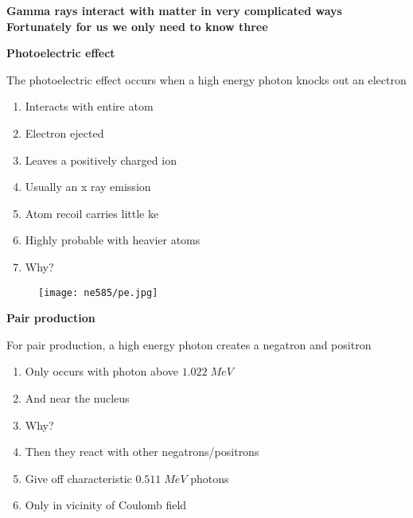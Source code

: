\documentclass[aspectratio=1610,pdftex,dvipsnames,compress,xcolor={dvipsnames}]{beamer}
\newcommand{\acf}{\acrfull} %
\begin{document}
\begin{frame}[plain]{}
    \centering\Large\textbf{Gamma rays interact with matter in very complicated ways}\\
    \centering\small\textbf{Fortunately for us we only need to know three}
\end{frame}


\begin{frame}[plain]{}
    \centering\LARGE\textbf{Photoelectric effect}
\end{frame}


\addtocounter{framenumber}{-2} 
\begin{frame}{The photoelectric effect occurs when a high energy photon knocks out an electron}
    \begin{enumerate}[series=outerlist,topsep=0pt,itemsep=21pt,leftmargin=*,label=(\arabic*)]
        \item[]Interacts with entire atom
        \item[]Electron ejected
        \item[]Leaves a positively charged ion
        \item[]Usually an x ray emission
        \item[]Atom recoil carries little \acf{ke}
        \item[]Highly probable with heavier atoms
        \item[]Why?
    \end{enumerate}
\end{frame}


\begin{frame}{}
    \begin{figure}
        \centering
        \texttt{[image: ne585/pe.jpg]}
    \end{figure}
\end{frame}


\begin{frame}[plain]{}
    \centering\LARGE\textbf{Pair production}
\end{frame}


\addtocounter{framenumber}{-1} 
\begin{frame}{For pair production, a high energy photon creates a negatron and positron}
    \begin{enumerate}[series=outerlist,topsep=0pt,itemsep=21pt,leftmargin=*,label=(\arabic*)]
        \item[]Only occurs with photon above $1.022 \; MeV$
        \item[]And near the nucleus
        \item[]Why?
        \item[]Then they react with other negatrons/positrons
        \item[]Give off characteristic $0.511 \; MeV$ photons
        \item[]Only in vicinity of Coulomb field
    \end{enumerate}
\end{frame}
\end{document}
